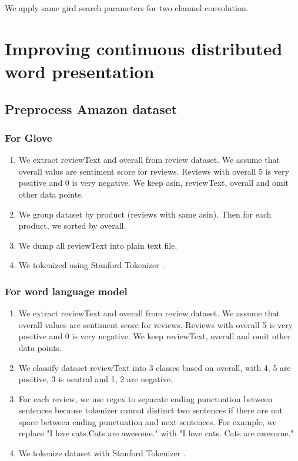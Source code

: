 We apply same gird search parameters for two channel convolution. 


\section{Improving continuous distributed word presentation} \label{sec:improveembedding}

\subsection{Preprocess Amazon dataset}
\subsubsection{For Glove}\label{sec:preprocessamazonglove}

\begin{enumerate}
	\item We extract reviewText and overall from review dataset. We assume that overall valus are sentiment score for reviews. Reviews with overall 5 is very positive and 0 is very negative. We keep asin, reviewText, overall and omit other data points.
	\item We group dataset by product (reviews with same asin). Then for each product, we sorted by overall.
	\item We dump all reviewText into plain text file.
	\item We tokenized using Stanford Tokenizer \cite{tokenizerpart}.
\end{enumerate}

\subsubsection{For word language model}
\begin{enumerate}
	\item We extract reviewText and overall from review dataset. We assume that overall values are sentiment score for reviews. Reviews with overall 5 is very positive and 0 is very negative. We keep reviewText, overall and omit other data points.
	\item We classify dataset reviewText into 3 classes based on overall, with 4, 5 are positive, 3 is neutral and 1, 2 are negative.
	\item For each review, we use regex to separate ending punctuation between sentences because tokenizer cannot distinct two sentences if there are not space between ending punctuation and next sentences. For example, we replace "I love cats.Cats are awesome." with "I love cats. Cats are awesome." 
	\item We tokenize dataset with Stanford Tokenizer \cite{tokenizerpart}.
\end{enumerate}

